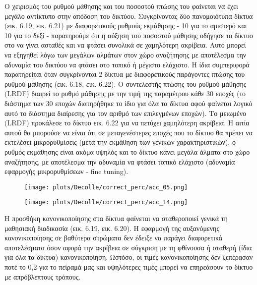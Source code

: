 \documentclass[12pt]{report}
\begin{document}
Ο χειρισμός του ρυθμού μάθησης και του ποσοστού πτώσης του φαίνεται να έχει μεγάλο αντίκτυπο στην απόδοση του δικτύου. Συγκρίνοντας δύο πανομοιότυπα δίκτυα (εικ. 6.19, εικ. 6.21) με διαφορετικούς ρυθμούς εκμάθησης - 10  για το αριστερό και 10 για το δεξί - παρατηρούμε ότι η αύξηση του ποσοστού μάθησης οδήγησε το δίκτυο στο να γίνει ασταθές και να φτάσει συνολικά σε χαμηλότερη ακρίβεια. Αυτό μπορεί να εξηγηθεί λόγω των μεγάλων αλμάτων στον χώρο αναζήτησης με αποτέλεσμα την αδυναμία του δικτύου να φτάσει στο τοπικό ή μέγιστο ελάχιστο. Η ίδια συμπεριφορά παρατηρείται όταν συγκρίνονται 2 δίκτυα με διαφορετικούς παράγοντες πτώσης του ρυθμού μάθησης (εικ. 6.18, εικ. 6.22). Ο συντελεστής πτώσης του ρυθμού μάθησης \textlatin{(LRDF)} διαιρεί το ρυθμό μάθησης με την τιμή της παραμέτρου κάθε 30 εποχές (το διάστημα των 30 εποχών διατηρήθηκε το ίδιο για όλα τα δίκτυα αφού φαίνεται λογικό αυτό το διάστημα διαίρεσης για τον αριθμό των επιλεγμένων εποχών). Το μειωμένο \textlatin{(LRDF)} προκάλεσε το δίκτυο εικ. 6.22 για να πετύχει χαμηλότερη ακρίβεια. Η αιτία αυτού θα μπορούσε να είναι ότι σε μεταγενέστερες εποχές που το δίκτυο θα πρέπει να εκτελέσει μικρορυθμίσεις (μετά την εκμάθηση των γενικών χαρακτηριστικών), ο ρυθμός εκμάθησης είναι ακόμα υψηλός και το δίκτυο κάνει μεγάλα άλματα στο χώρο αναζήτησης, με αποτέλεσμα την αδυναμία να φτάσει τοπικό ελάχιστο (αδυναμία εφαρμογής μικρορυθμίσεων - \textlatin{fine tuning}).

\begin{figure}
\centering
\begin{minipage}{.4\textwidth}
  \centering
  \texttt{[image: plots/Decolle/correct\_perc/acc\_05.png]}
  \label{fig:test1}
\end{minipage}
\begin{minipage}{.4\textwidth}
  \centering
  \texttt{[image: plots/Decolle/correct\_perc/acc\_14.png]}
  \label{fig:test2}
\end{minipage}
\end{figure}

Η προσθήκη κανονικοποίησης στα δίκτυα φαίνεται να σταθεροποιεί γενικά τη μαθησιακή διαδικασία (εικ. 6.19, εικ. 6.20). Η εφαρμογή της αυξανόμενης κανονικοποίησης σε βαθύτερα στρώματα δεν έδειξε να παράγει διαφορετικά αποτελέσματα όσον αφορά την ακρίβεια σε σύγκριση με τη φθίνουσα ή σταθερή (ίδια για όλα τα δίκτυα) κανονικοποίηση. Ωστόσο, οι τιμές κανονικοποίησης δεν ξεπέρασαν ποτέ το 0,2 για το πείραμά μας και υψηλότερες τιμές μπορεί να επηρεάσουν το δίκτυο με απρόβλεπτους τρόπους.
\end{document}
